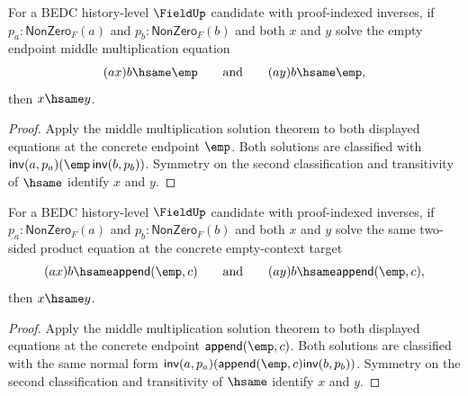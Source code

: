 \begin{theorem}
\label{thm:field-middle-mul-empty-equation-solution-unique-from-apartness}
For a BEDC history-level $\FieldUp$ candidate with proof-indexed inverses, if
$p_a:\mathsf{NonZero}_F(a)$ and $p_b:\mathsf{NonZero}_F(b)$ and both $x$ and
$y$ solve the empty endpoint middle multiplication equation
$$
(a x)b\hsame \emp
\qquad\text{and}\qquad
(a y)b\hsame \emp,
$$
then $x\hsame y$.
\end{theorem}
\begin{proof}
Apply the middle multiplication solution theorem to both displayed equations at
the concrete endpoint $\emp$. Both solutions are classified with
$\mathsf{inv}(a,p_a)(\emp\,\mathsf{inv}(b,p_b))$. Symmetry on the second
classification and transitivity of $\hsame$ identify $x$ and $y$.
\end{proof}

\begin{theorem}
\label{thm:field-two-sided-empty-context-product-solution-unique}
For a BEDC history-level $\FieldUp$ candidate with proof-indexed inverses, if
$p_a:\mathsf{NonZero}_F(a)$ and $p_b:\mathsf{NonZero}_F(b)$ and both $x$ and
$y$ solve the same two-sided product equation at the concrete empty-context
target
$$
(a x)b\hsame \mathsf{append}(\emp,c)
\qquad\text{and}\qquad
(a y)b\hsame \mathsf{append}(\emp,c),
$$
then $x\hsame y$.
\end{theorem}
\begin{proof}
Apply the middle multiplication solution theorem to both displayed equations at
the concrete endpoint $\mathsf{append}(\emp,c)$. Both solutions are classified
with the same normal form
$\mathsf{inv}(a,p_a)(\mathsf{append}(\emp,c)\mathsf{inv}(b,p_b))$.
Symmetry on the second classification and transitivity of $\hsame$ identify
$x$ and $y$.
\end{proof}
